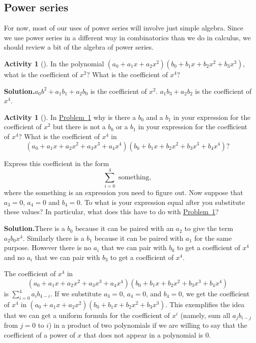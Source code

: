 \documentclass[10pt,]{book}
\theoremstyle{plain}
\theoremstyle{definition}
\newtheorem{activity}[project]{Activity}
\numberwithin{equation}{chapter}
\begin{document}
\subsection[{Power series}]{Power series}\label{subsection-42}
For now, most of our uses of power series will involve just simple algebra. Since we use power series in a different way in combinatorics than we do in calculus, we should review a bit of the algebra of power series.%
\begin{activity}[]\label{coeffinproduct}
In the polynomial \((a_0 +a_1x+a_2x^2)(b_0+b_1x+b_2x^2+b_3x^3)\), what is the coefficient of \(x^2\)? What is the coefficient of \(x^4\)?%
\par\medskip\noindent%
\textbf{Solution.}\quad \(a_0b^2+a_1b_1+a_2b_0\) is the coefficient of \(x^2\). \(a_1b_3+a_2b_2\) is the coefficient of \(x^4\).%
\end{activity}
\begin{activity}[]\label{coeffinproduct1}
In \hyperref[coeffinproduct]{Problem~\ref{coeffinproduct}} why is there a \(b_0\) and a \(b_1\) in your expression for the coefficient of \(x^2\) but there is not a \(b_0\) or a \(b_1\) in your expression for the coefficient of \(x^4\)? What is the coefficient of \(x^4\) in%
\begin{equation*}
(a_0+a_1x+a_2x^2+a_3x^3+a_4x^4)(b_0+b_1x+b_2x^2
+b_3x^3+b_4x^4)?
\end{equation*}
%
\par
Express this coefficient in the form%
\begin{equation*}
\sum_{i=0}^4 \mbox{ something} ,
\end{equation*}
where the something is an expression you need to figure out. Now suppose that \(a_3=0\), \(a_4=0\) and \(b_4=0\). To what is your expression equal after you substitute these values? In particular, what does this have to do with \hyperref[coeffinproduct]{Problem~\ref{coeffinproduct}}?%
\par\medskip\noindent%
\textbf{Solution.}\quad There is a \(b_0\) because it can be paired with an \(a_2\) to give the term \(a_2b_0x^4\). Similarly there is a \(b_1\) because it can be paired with \(a_1\) for the same purpose. However there is no \(a_i\) that we can pair with \(b_0\) to get a coefficient of \(x^4\) and no \(a_i\) that we can pair with \(b_3\) to get a coefficient of \(x^4\).%
\par
The coefficient of \(x^4\) in%
\begin{equation*}
(a_0+a_1x+a_2x^2+a_3x^3+a_4x^4)(b_0+b_1x+b_2x^2
+b_3x^3+b_4x^4)
\end{equation*}
is \(\sum_{i=0}^4 a_ib_{4-i}\). If we substitute \(a_3=0\), \(a_4=0\), and \(b_4 =0\), we get the coefficient of \(x^4\) in \((a_0
+a_1x+a_2x^2)(b_0+b_1x+b_2x^2+b_3x^3)\). This exemplifies the idea that we can get a uniform formula for the coefficient of \(x^i\) (namely, sum all \(a_jb_{i-j}\) from \(j=0\) to \(i\)) in a product of two polynomials if we are willing to say that the coefficient of a power of \(x\) that does not appear in a polynomial is 0.%
\end{activity}
\end{document}
